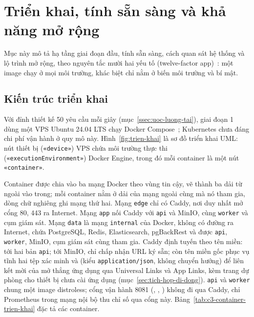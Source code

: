 \section{Triển khai, tính sẵn sàng và khả năng mở rộng}\label{sec:trien-khai}

Mục này mô tả hạ tầng giai đoạn đầu, tính sẵn sàng, cách quan sát hệ thống và lộ trình mở rộng, theo nguyên tắc mười hai yếu tố (twelve-factor app)~\cite{twelvefactor}: một image chạy ở mọi môi trường, khác biệt chỉ nằm ở biến môi trường và bí mật.

\subsection{Kiến trúc triển khai}\label{ssec:kien-truc-trien-khai}

Với đỉnh thiết kế 50 yêu cầu mỗi giây (mục~\ref{ssec:uoc-luong-tai}), giai đoạn 1 dùng một VPS Ubuntu 24.04 LTS chạy Docker Compose~\cite{docker}; Kubernetes chưa đáng chi phí vận hành ở quy mô này. Hình~\ref{fig:trien-khai} là sơ đồ triển khai UML: nút thiết bị (\texttt{«device»}) VPS chứa môi trường thực thi (\texttt{«executionEnvironment»}) Docker Engine, trong đó mỗi container là một nút \texttt{«container»}.


Container được chia vào ba mạng Docker theo vùng tin cậy, vẽ thành ba dải từ ngoài vào trong; mỗi container nằm ở dải của mạng ngoài cùng mà nó tham gia, dòng chữ nghiêng ghi mạng thứ hai. Mạng \texttt{edge} chỉ có Caddy, nơi duy nhất mở cổng 80, 443 ra Internet. Mạng \texttt{app} nối Caddy với \texttt{api} và MinIO, cùng \texttt{worker} và cụm giám sát. Mạng \texttt{data} là mạng \texttt{internal} của Docker, không có đường ra Internet, chứa PostgreSQL, Redis, Elasticsearch, pgBackRest và được \texttt{api}, \texttt{worker}, MinIO, cụm giám sát cùng tham gia. Caddy định tuyến theo tên miền:  tới hai bản \texttt{api};  tới MinIO, chỉ chấp nhận URL ký sẵn; còn tên miền gốc  phục vụ tĩnh hai tệp xác minh  và  (kiểu \texttt{application/json}, không chuyển hướng) để liên kết mời  của  mở thẳng ứng dụng qua Universal Links và App Links, kèm trang dự phòng cho thiết bị chưa cài ứng dụng (mục~\ref{sec:tich-hop-di-dong}). \texttt{api} và \texttt{worker} chung một image distroless; cổng vận hành 8081 (, , ) không đi qua Caddy, chỉ Prometheus trong mạng nội bộ thu chỉ số qua cổng này. Bảng~\ref{tab:c3-container-trien-khai} đặc tả các container.

